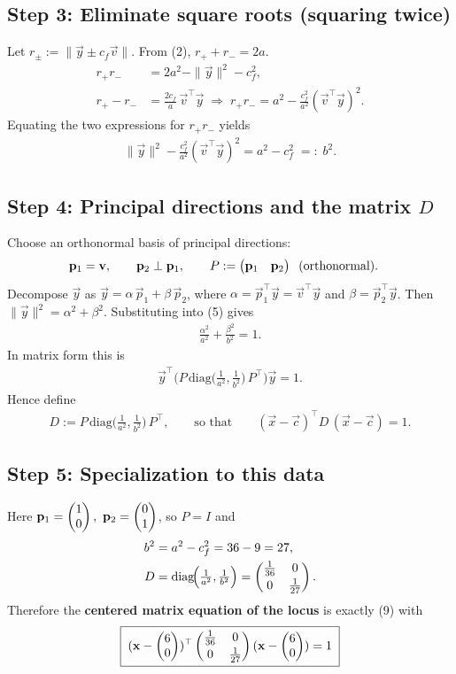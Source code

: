 \documentclass[12pt]{article}
\begin{document}
\subsection*{Step 3: Eliminate square roots (squaring twice)}
Let $r_\pm:=\|\vec y\pm c_f\vec v\|$. From (2), $r_++r_-=2a$.
\begin{align}
r_+r_- &= 2a^2-\|\vec y\|^2-c_f^2, \\
r_+-r_- &= \frac{2c_f}{a}\,\vec v^\top\vec y
\;\Rightarrow\;
r_+r_- = a^2-\frac{c_f^2}{a^2}(\vec v^\top\vec y)^2.
\end{align}
Equating the two expressions for $r_+r_-$ yields
\begin{align}
\|\vec y\|^2-\frac{c_f^2}{a^2}(\vec v^\top\vec y)^2 = a^2-c_f^2 \;=:\; b^2.
\end{align}

\subsection*{Step 4: Principal directions and the matrix $D$}
Choose an orthonormal basis of principal directions:
\begin{align}
\mathbf p_1 &= \mathbf v, \qquad \mathbf p_2 \perp \mathbf p_1, \qquad
P:=\begin{pmatrix}\mathbf p_1 & \mathbf p_2\end{pmatrix} \;\;\text{(orthonormal)}.
\end{align}
Decompose $\vec y$ as $\vec y = \alpha\,\vec p_1 + \beta\,\vec p_2$, where
$\alpha=\vec p_1^\top\vec y=\vec v^\top\vec y$ and $\beta=\vec p_2^\top\vec y$.
Then $\|\vec y\|^2=\alpha^2+\beta^2$. Substituting into (5) gives
\begin{align}
\frac{\alpha^2}{a^2}+\frac{\beta^2}{b^2}=1.
\end{align}
In matrix form this is
\begin{align}
\vec y^\top \Big(P\,\mathrm{diag}\!\big(\tfrac{1}{a^2},\tfrac{1}{b^2}\big)\,P^\top\Big)\vec y = 1.
\end{align}
Hence define
\begin{align}
D := P\,\mathrm{diag}\!\Big(\tfrac{1}{a^2},\tfrac{1}{b^2}\Big)\,P^\top,
\qquad\text{so that}\qquad
(\vec x-\vec c)^\top D\,(\vec x-\vec c)=1. 
\end{align}

\subsection*{Step 5: Specialization to this data}
Here $\mathbf p_1=\begin{pmatrix}1\\0\end{pmatrix},\ \mathbf p_2=\begin{pmatrix}0\\1\end{pmatrix}$, so $P=I$ and
\begin{align}
b^2 &= a^2-c_f^2 = 36-9=27, \\
D &= \mathrm{diag}\!\Big(\tfrac{1}{a^2},\tfrac{1}{b^2}\Big)
= \begin{pmatrix}\tfrac{1}{36}&0\\[2pt]0&\tfrac{1}{27}\end{pmatrix}.
\end{align}
Therefore the \textbf{centered matrix equation of the locus} is exactly (9) with
\begin{align}
\boxed{\;(\mathbf x-\begin{pmatrix}6\\0\end{pmatrix})^\top
\begin{pmatrix}\tfrac{1}{36}&0\\[2pt]0&\tfrac{1}{27}\end{pmatrix}
(\mathbf x-\begin{pmatrix}6\\0\end{pmatrix})=1\;}
\end{align}
\end{document}
